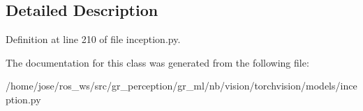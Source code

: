 \subsection{Detailed Description}


Definition at line 210 of file inception.\+py.



The documentation for this class was generated from the following file\+:\begin{DoxyCompactItemize}
\item 
/home/jose/ros\+\_\+ws/src/gr\+\_\+perception/gr\+\_\+ml/nb/vision/torchvision/models/inception.\+py\end{DoxyCompactItemize}
